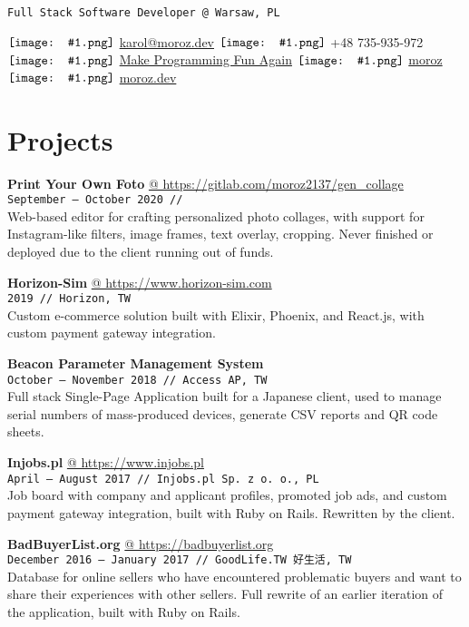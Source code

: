 \documentclass[10pt,a4paper]{article}
\author{Karol Moroz}
\makeatletter
\newcommand{\icon}[1]{$\vcenter{\hbox{\texttt{[image: \#1.png]}}}$\hspace{.2em}}
\newcommand{\project}[3]{\par\vspace{1em}\textbf{\normalsize #1}\\{\footnotesize\texttt{#2 // #3}}\\[4pt]}
\newcommand{\projectweb}[4]{\par\vspace{1em}\textbf{\normalsize #1} \href{#2}{\color{darkgray} @ #2}\\{\footnotesize\texttt{#3 // #4}}\\[4pt]}
\makeatother
\begin{document}
\pagestyle{empty}

\texttt{Full Stack Software Developer @ Warsaw, PL}

\icon{email}
\href{mailto:karol@moroz.dev}{karol@moroz.dev} \hfill
\icon{telephone} +48 735-935-972 \hfill
\icon{youtube} \href{https://www.youtube.com/channel/UCW_YiVuoo-WG0bxQElVgxAg}{Make Programming Fun Again} \hfill
\icon{github} \href{https://github.com/moroz}{moroz} \hfill
\icon{web} \href{https://moroz.dev}{moroz.dev}

\begin{minipage}[t]{0.67\textwidth}
  \raggedright
  \section{Projects}
  \vspace*{-6pt}

  \projectweb{Print Your Own Foto}{https://gitlab.com/moroz2137/gen_collage}{September {–} October 2020}

  \small
  Web-based editor for crafting personalized photo collages, with support for Instagram-like filters, image frames, text overlay, cropping. Never finished or deployed due to the client running out of funds.

  \projectweb{Horizon-Sim}{https://www.horizon-sim.com}{2019}{Horizon, TW}

  \small
  Custom e-commerce solution built with Elixir, Phoenix, and React.js, with custom payment gateway integration.

  \project{Beacon Parameter Management System}{October {–} November 2018}{Access AP, TW}

  \small
  Full stack Single-Page Application built for a Japanese client, used to manage serial numbers of mass-produced
  devices, generate CSV reports and QR code sheets.

  \projectweb{Injobs.pl}{https://www.injobs.pl}{April {–} August 2017}{Injobs.pl Sp. z o. o., PL}

  \small
  Job board with company and applicant profiles, promoted job ads, and custom payment gateway integration, built with Ruby on Rails. Rewritten by the client.

  \projectweb{BadBuyerList.org}{https://badbuyerlist.org}{December 2016 {–} January 2017}{GoodLife.TW 好生活, TW}

  \small
  Database for online sellers who have encountered problematic buyers and want to share their experiences with other sellers. Full rewrite of an earlier iteration of the application, built with Ruby on Rails.


\end{minipage}
\end{document}
